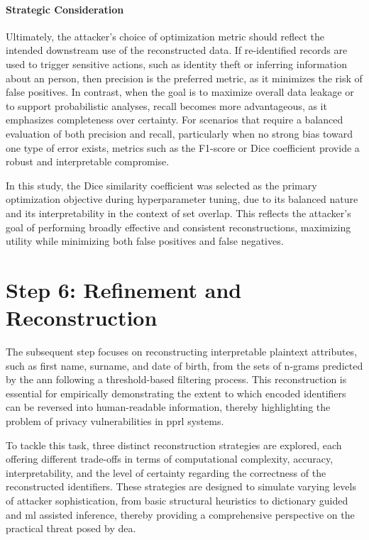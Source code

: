 \paragraph{Strategic Consideration}

Ultimately, the attacker’s choice of optimization metric should reflect the intended downstream use of the reconstructed data.
If re-identified records are used to trigger sensitive actions, such as identity theft or inferring information about an person, then precision is the preferred metric, as it minimizes the risk of false positives.
In contrast, when the goal is to maximize overall data leakage or to support probabilistic analyses, recall becomes more advantageous, as it emphasizes completeness over certainty.
For scenarios that require a balanced evaluation of both precision and recall, particularly when no strong bias toward one type of error exists, metrics such as the F1-score or Dice coefficient provide a robust and interpretable compromise.

In this study, the Dice similarity coefficient was selected as the primary optimization objective during hyperparameter tuning, due to its balanced nature and its interpretability in the context of set overlap.
This reflects the attacker’s goal of performing broadly effective and consistent reconstructions, maximizing utility while minimizing both false positives and false negatives.

\section{Step 6: Refinement and Reconstruction} \label{sec:refinementandreconstruction}

The subsequent step focuses on reconstructing interpretable plaintext attributes, such as first name, surname, and date of birth, from the sets of n-grams predicted by the \ac{ann} following a threshold-based filtering process.
This reconstruction is essential for empirically demonstrating the extent to which encoded identifiers can be reversed into human-readable information, thereby highlighting the problem of privacy vulnerabilities in \ac{pprl} systems.

To tackle this task, three distinct reconstruction strategies are explored, each offering different trade-offs in terms of computational complexity, accuracy, interpretability, and the level of certainty regarding the correctness of the reconstructed identifiers.
These strategies are designed to simulate varying levels of attacker sophistication, from basic structural heuristics to dictionary guided and \ac{ml} assisted inference, thereby providing a comprehensive perspective on the practical threat posed by \ac{dea}.

